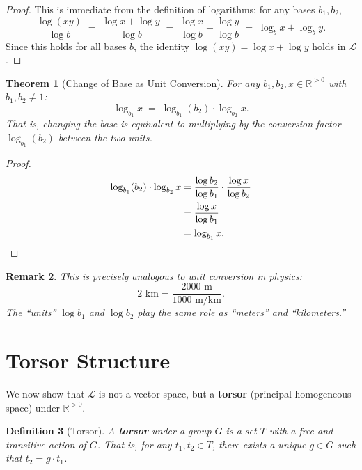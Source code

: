 \documentclass[11pt]{article}
\newtheorem{definition}{Definition}[section]
\newtheorem{theorem}[definition]{Theorem}
\newtheorem{remark}[definition]{Remark}
\begin{document}
\begin{proof}
This is immediate from the definition of logarithms: for any bases $b_1, b_2$,
\[
\frac{\log(xy)}{\log b} \;=\; \frac{\log x + \log y}{\log b} \;=\; \frac{\log x}{\log b} + \frac{\log y}{\log b} \;=\; \log_b x + \log_b y.
\]
Since this holds for all bases $b$, the identity $\log(xy) = \log x + \log y$ holds in $\mathcal{L}$.
\end{proof}

\begin{theorem}[Change of Base as Unit Conversion]
\label{thm:changebase}
For any $b_1, b_2, x \in \mathbb{R}^{>0}$ with $b_1, b_2 \neq 1$:
\[
\log_{b_1} x \;=\; \log_{b_1}(b_2) \cdot \log_{b_2} x.
\]
That is, changing the base is equivalent to multiplying by the \emph{conversion factor} $\log_{b_1}(b_2)$ between the two units.
\end{theorem}

\begin{proof}
\begin{align*}
\log_{b_1}(b_2) \cdot \log_{b_2} x
&= \frac{\log b_2}{\log b_1} \cdot \frac{\log x}{\log b_2} \\
&= \frac{\log x}{\log b_1} \\
&= \log_{b_1} x. \qedhere
\end{align*}
\end{proof}

\begin{remark}
This is precisely analogous to unit conversion in physics:
\[
2 \text{ km} = \frac{2000 \text{ m}}{1000 \text{ m/km}}.
\]
The ``units'' $\log b_1$ and $\log b_2$ play the same role as ``meters'' and ``kilometers.''
\end{remark}

\section{Torsor Structure}
\label{sec:torsor}

We now show that $\mathcal{L}$ is not a vector space, but a \textbf{torsor} (principal homogeneous space) under $\mathbb{R}^{>0}$.

\begin{definition}[Torsor]
A \textbf{torsor} under a group $G$ is a set $T$ with a free and transitive action of $G$. That is, for any $t_1, t_2 \in T$, there exists a unique $g \in G$ such that $t_2 = g \cdot t_1$.
\end{definition}
\end{document}

